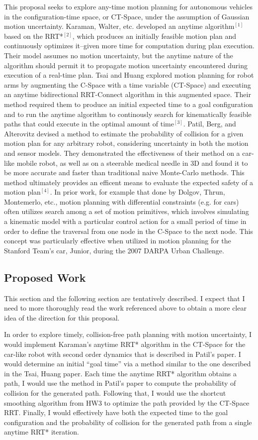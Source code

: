 \documentclass[12pt]{article}
\begin{document}
This proposal seeks to explore any-time motion planning for autonomous vehicles in the configuration-time space, or CT-Space, under the assumption of Gaussian motion uncertainty. Karaman, Walter, etc. developed an anytime algorithm$^{[1]}$ based on the RRT*$^{[2]}$, which produces an initially feasible motion plan and continuously optimizes it--given more time for computation during plan execution. Their model assumes no motion uncertainty, but the anytime nature of the algorithm should permit it to propagate motion uncertainty encountered during execution of a real-time plan. Tsai and Huang explored motion planning for robot arms by augmenting the C-Space with a time variable (CT-Space) and executing an anytime bidirectional RRT-Connect algorithm in this augmented space. Their method required them to produce an initial expected time to a goal configuration and to run the anytime algorithm to continously search for kinematically feasible paths that could execute in the optimal amount of time$^{[3]}$. Patil, Berg, and Alterovitz devised a method to estimate the probability of collision for a given motion plan for any arbitrary robot, considering uncertainty in both the motion and sensor models. They demonstrated the effectiveness of their method on a car-like mobile robot, as well as on a steerable medical needle in 3D and found it to be more accurate and faster than traditional naive Monte-Carlo methods. This method ultimately provides an efficent means to evaluate the expected safety of a motion plan$^{[4]}$. In prior work, for example that done by Dolgov, Thrun, Montemerlo, etc., motion planning with differential constraints (e.g. for cars) often utilizes search among a set of motion primitives, which involves simulating a kinematic model with a particular control action for a small period of time in order to define the traversal from one node in the C-Space to the next node. This concept was particularly effective when utilized in motion planning for the Stanford Team's car, Junior, during the 2007 DARPA Urban Challenge.

\subsection*{Proposed Work}
This section and the following section are tentatively described. I expect that I need to more thoroughly read the work referenced above to obtain a more clear idea of the direction for this proposal.

In order to explore timely, collision-free path planning with motion uncertainty, I would implement Karaman's anytime RRT* algorithm in the CT-Space for the car-like robot with second order dynamics that is described in Patil's paper. I would determine an initial ``goal time'' via a method similar to the one described in the Tsai, Huang paper. Each time the anytime RRT* algorithm obtains a path, I would use the method in Patil's paper to compute the probability of collision for the generated path. Following that, I would use the shortcut smoothing algorithm from HW3 to optimize the path provided by the CT-Space RRT. Finally, I would effectively have both the expected time to the goal configuration and the probability of collision for the generated path from a single anytime RRT* iteration.
\end{document}
